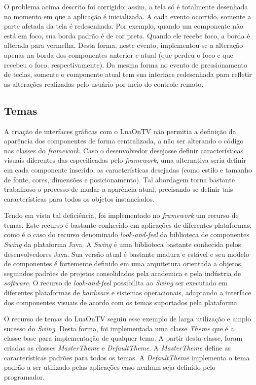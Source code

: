 O problema acima descrito foi corrigido: assim, a tela só é totalmente desenhada no momento
em que a aplicação é inicializada. A cada evento ocorrido, somente a parte
afetada da tela é redesenhada. Por exemplo, quando um componente não está em foco,
sua borda padrão é de cor preta. Quando ele recebe foco, a borda é alterada para
vermelha. Desta forma, neste evento, implementou-se a alteração apenas na borda dos
componentes anterior e atual (que perdeu o foco e que recebeu o foco, respectivamente).
Da mesma forma no evento de pressionamento de teclas, somente o componente atual
tem sua interface redesenhada para refletir as alterações realizadas pelo usuário
por meio do controle remoto.

\subsection{Temas}
A criação de interfaces gráficas com o LuaOnTV não permitia a definição da aparência dos componentes
de forma centralizada, a não ser alterando o código nas classes do \textit{framework}.
Caso o desenvolvedor desejasse definir características visuais diferentes das especificadas
pelo \textit{framework}, uma alternativa seria definir em cada componente inserido, as características
desejadas (como estilo e tamanho de fonte, cores, dimensões e posicionamento).
Tal abordagem torna bastante trabalhoso o processo de mudar a aparência atual, precisando-se
definir tais características para todos os objetos instanciados.

Tendo em vista tal deficiência, foi implementado no \textit{framework} um recurso de temas.
Este recurso é bastante conhecido em aplicações de diferentes plataformas, como
é o caso do recurso denominado \textit{look-and-feel} da biblioteca de componentes \textit{Swing} da plataforma Java\cite{fowler2000swing}.
A \textit{Swing} é uma biblioteca bastante conhecida pelos desenvolvedores Java. Sua versão atual é bastante madura e estável
e seu modelo de componentes é fortemente definido em uma arquitetura orientada a objetos, seguindos padrões
de projetos consolidados pela academica e pela indústria de \textit{software}. O recurso de \textit{look-and-feel}
possibilita ao \textit{Swing} ser executado em diferentes plataformas de \textit{hardware} e sistemas operacionais,
adaptando a interface dos componentes visuais de acordo com os temas suportados pela plataforma.

O recurso de temas do LuaOnTV seguiu esse exemplo de larga utilização e amplo sucesso do \textit{Swing}. 
Desta forma, foi implementada uma classe \textit{Theme} que 
é a classe base para implementação de qualquer tema.
A partir desta classe, foram criadas as classes \textit{MasterTheme} e \textit{DefaultTheme}.
A \textit{MasterTheme} define as características padrões para todos os temas.
A \textit{DefaultTheme} implementa o tema padrão a ser utilizado pelas aplicações caso nenhum seja definido
pelo programador.

